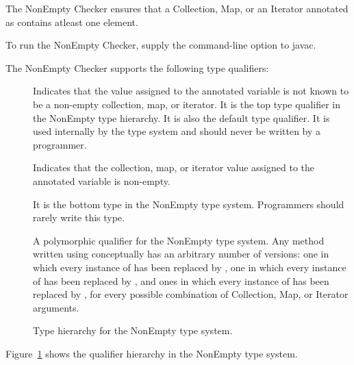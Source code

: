 \htmlhr
{}

The NonEmpty Checker ensures that a Collection, Map, or an Iterator annotated as
 contains atleast one element.

To run the NonEmpty Checker, supply the
command-line option to javac.

The NonEmpty Checker supports the following type qualifiers:
\begin{description}

    \item[]
    Indicates that the value assigned to the annotated variable is not known to be a non-empty
    collection, map, or iterator. It is the top type qualifier in the NonEmpty type hierarchy. It is also the default type
    qualifier.
    It is used internally by the type system and should never be written by a programmer.

    \item[]
    Indicates that the collection, map, or iterator value assigned to the annotated variable is non-empty.

    \item[]
    It is the bottom type in the NonEmpty type system. Programmers should rarely write this type.

    \item[]
    A polymorphic qualifier for the NonEmpty type system.
    Any method written using  conceptually has an arbitrary number of
    versions: one in which every instance of  has been replaced by
    , one in which every instance of 
    has been replaced by , and ones in which every instance of
     has been replaced by , for every possible
    combination of Collection, Map, or Iterator arguments.

\end{description}

\begin{figure}
    \caption{Type hierarchy for the NonEmpty type system.}
    \label{fig-nonempty-hierarchy}
\end{figure}

Figure~\ref{fig-nonempty-hierarchy} shows the qualifier hierarchy in the NonEmpty type system.
